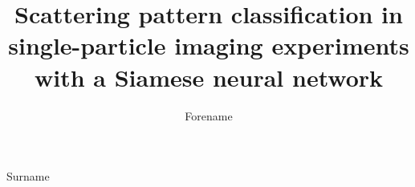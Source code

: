 \documentclass[preprint]{iucr}
\begin{document}
    \title{Scattering pattern classification in single-particle imaging experiments with a Siamese neural network}
    \author[a]{Forename}{Surname}

    \maketitle

    
    
    

    
    
    

    
    
\end{document}
